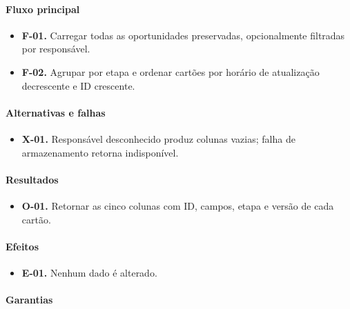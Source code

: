 \documentclass[10pt,a4paper]{article}
\begin{document}
\paragraph{Fluxo principal}

\begin{itemize}

\item \textbf{F-01.} Carregar todas as oportunidades preservadas, opcionalmente filtradas por responsável.

\item \textbf{F-02.} Agrupar por etapa e ordenar cartões por horário de atualização decrescente e ID crescente.

\end{itemize}

\paragraph{Alternativas e falhas}

\begin{itemize}

\item \textbf{X-01.} Responsável desconhecido produz colunas vazias; falha de armazenamento retorna indisponível.

\end{itemize}

\paragraph{Resultados}

\begin{itemize}

\item \textbf{O-01.} Retornar as cinco colunas com ID, campos, etapa e versão de cada cartão.

\end{itemize}

\paragraph{Efeitos}

\begin{itemize}

\item \textbf{E-01.} Nenhum dado é alterado.

\end{itemize}

\paragraph{Garantias}
\end{document}
